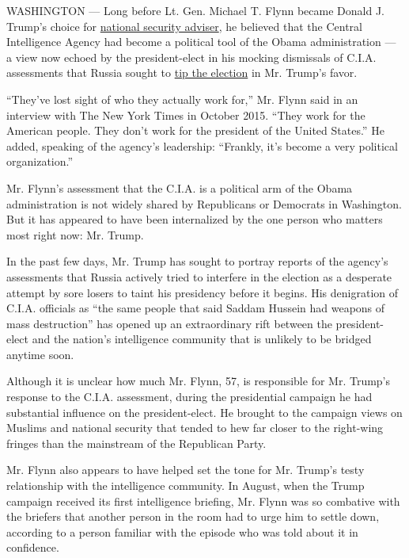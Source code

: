WASHINGTON --- Long before Lt. Gen. Michael T. Flynn became Donald J.
Trump's choice for
\href{https://www.nytimes.com/2016/11/18/us/politics/michael-flynn-national-security-adviser-donald-trump.html?_r=0}{national
security adviser}, he believed that the Central Intelligence Agency had
become a political tool of the Obama administration --- a view now
echoed by the president-elect in his mocking dismissals of C.I.A.
assessments that Russia sought to
\href{https://www.nytimes.com/2016/12/11/us/politics/cia-judgment-intelligence-russia-hacking-evidence.html}{tip
the election} in Mr. Trump's favor.

``They've lost sight of who they actually work for,'' Mr. Flynn said in
an interview with The New York Times in October 2015. ``They work for
the American people. They don't work for the president of the United
States.'' He added, speaking of the agency's leadership: ``Frankly, it's
become a very political organization.''

Mr. Flynn's assessment that the C.I.A. is a political arm of the Obama
administration is not widely shared by Republicans or Democrats in
Washington. But it has appeared to have been internalized by the one
person who matters most right now: Mr. Trump.

In the past few days, Mr. Trump has sought to portray reports of the
agency's assessments that Russia actively tried to interfere in the
election as a desperate attempt by sore losers to taint his presidency
before it begins. His denigration of C.I.A. officials as ``the same
people that said Saddam Hussein had weapons of mass destruction'' has
opened up an extraordinary rift between the president-elect and the
nation's intelligence community that is unlikely to be bridged anytime
soon.

Although it is unclear how much Mr. Flynn, 57, is responsible for Mr.
Trump's response to the C.I.A. assessment, during the presidential
campaign he had substantial influence on the president-elect. He brought
to the campaign views on Muslims and national security that tended to
hew far closer to the right-wing fringes than the mainstream of the
Republican Party.

Mr. Flynn also appears to have helped set the tone for Mr. Trump's testy
relationship with the intelligence community. In August, when the Trump
campaign received its first intelligence briefing, Mr. Flynn was so
combative with the briefers that another person in the room had to urge
him to settle down, according to a person familiar with the episode who
was told about it in confidence.

